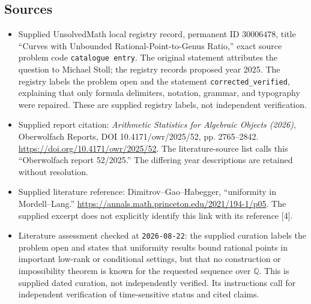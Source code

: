 \documentclass[11pt]{article}
\newcommand{\Q}{\mathbb{Q}}
\begin{document}
\subsection{Sources}
\begin{itemize}
\item Supplied UnsolvedMath local registry record, permanent ID \(30006478\), title ``Curves with Unbounded Rational-Point-to-Genus Ratio,'' exact source problem code \texttt{catalogue entry}. The original statement attributes the question to Michael Stoll; the registry records proposed year 2025. The registry labels the problem open and the statement \texttt{corrected\_verified}, explaining that only formula delimiters, notation, grammar, and typography were repaired. These are supplied registry labels, not independent verification.
\item Supplied report citation: \emph{Arithmetic Statistics for Algebraic Objects (2026)}, Oberwolfach Reports, DOI 10.4171/owr/2025/52, pp. 2765--2842. \url{https://doi.org/10.4171/owr/2025/52}. The literature-source list calls this ``Oberwolfach report 52/2025.'' The differing year descriptions are retained without resolution.
\item Supplied literature reference: Dimitrov--Gao--Habegger, ``uniformity in Mordell--Lang.'' \url{https://annals.math.princeton.edu/2021/194-1/p05}. The supplied excerpt does not explicitly identify this link with its reference [4].
\item Literature assessment checked at \texttt{2026-08-22}: the supplied curation labels the problem open and states that uniformity results bound rational points in important low-rank or conditional settings, but that no construction or impossibility theorem is known for the requested sequence over \(\Q\). This is supplied dated curation, not independently verified. Its instructions call for independent verification of time-sensitive status and cited claims.
\end{itemize}
\end{document}
